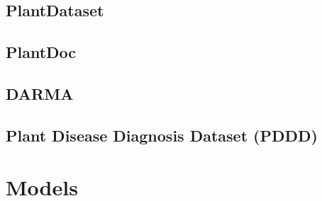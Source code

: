 \subsection{PlantDataset}
\subsection{PlantDoc}
\subsection{DARMA}
\subsection{Plant Disease Diagnosis Dataset (PDDD)}

\section{Models}

